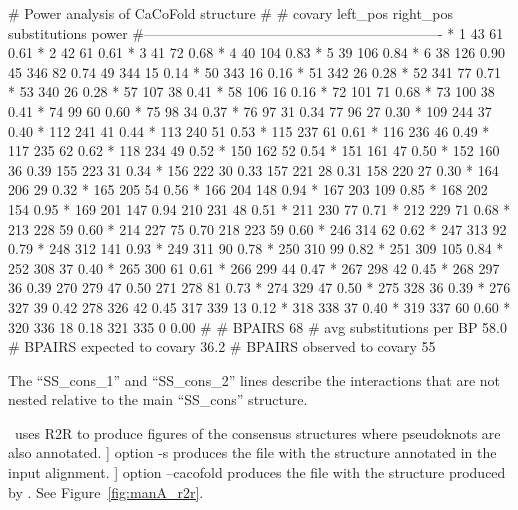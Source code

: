 \begin{sreoutput}
# Power analysis of CaCoFold structure 
#
# covary  left_pos      right_pos    substitutions      power
#----------------------------------------------------------------
     *    1		43		61		0.61
     *    2		42		61		0.61
     *    3		41		72		0.68
     *    4		40		104		0.83
     *    5		39		106		0.84
     *    6		38		126		0.90
          45		346		82		0.74
          49		344		15		0.14
     *    50		343		16		0.16
     *    51		342		26		0.28
     *    52		341		77		0.71
     *    53		340		26		0.28
     *    57		107		38		0.41
     *    58		106		16		0.16
     *    72		101		71		0.68
     *    73		100		38		0.41
     *    74		99		60		0.60
     *    75		98		34		0.37
     *    76		97		31		0.34
          77		96		27		0.30
     *    109		244		37		0.40
     *    112		241		41		0.44
     *    113		240		51		0.53
     *    115		237		61		0.61
     *    116		236		46		0.49
     *    117		235		62		0.62
     *    118		234		49		0.52
     *    150		162		52		0.54
     *    151		161		47		0.50
     *    152		160		36		0.39
          155		223		31		0.34
     *    156		222		30		0.33
          157		221		28		0.31
          158		220		27		0.30
     *    164		206		29		0.32
     *    165		205		54		0.56
     *    166		204		148		0.94
     *    167		203		109		0.85
     *    168		202		154		0.95
     *    169		201		147		0.94
          210		231		48		0.51
     *    211		230		77		0.71
     *    212		229		71		0.68
     *    213		228		59		0.60
     *    214		227		75		0.70
          218		223		59		0.60
     *    246		314		62		0.62
     *    247		313		92		0.79
     *    248		312		141		0.93
     *    249		311		90		0.78
     *    250		310		99		0.82
     *    251		309		105		0.84
     *    252		308		37		0.40
     *    265		300		61		0.61
     *    266		299		44		0.47
     *    267		298		42		0.45
     *    268		297		36		0.39
          270		279		47		0.50
          271		278		81		0.73
     *    274		329		47		0.50
     *    275		328		36		0.39
     *    276		327		39		0.42
          278		326		42		0.45
          317		339		13		0.12
     *    318		338		37		0.40
     *    319		337		60		0.60
     *    320		336		18		0.18
          321		335		0		0.00
#
# BPAIRS 68
# avg substitutions per BP  58.0
# BPAIRS expected to covary 36.2
# BPAIRS observed to covary 55
\end{sreoutput}

\noindent
 The ``SS\_cons\_1'' and ``SS\_cons\_2'' lines describe the
 interactions that are not nested relative to the main ``SS\_cons''
 structure.

\rscape\, uses R2R to produce figures of the consensus structures
where pseudoknots are also annotated.  \rscape] option -s produces the
  file  with the structure
  annotated in the input alignment. \rscape] option --cacofold produces the
    file  with the
    structure produced by \rscape. See Figure~\ref{fig:manA_r2r}.


